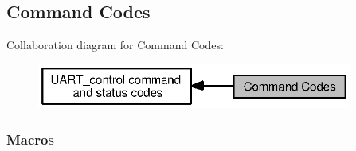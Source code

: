 \subsection{Command Codes}
\label{group___u_a_r_t___c_m_d}
Collaboration diagram for Command Codes\+:
\nopagebreak
\begin{figure}[H]
\begin{center}
\leavevmode
\includegraphics[width=293pt]{group___u_a_r_t___c_m_d}
\end{center}
\end{figure}
\subsubsection*{Macros}
